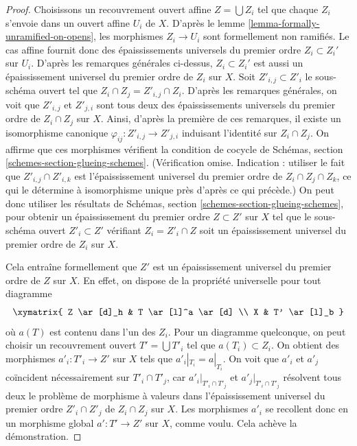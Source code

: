 \begin{proof}
\medskip\noindent
Choisissons un recouvrement ouvert affine $Z = \bigcup Z_i$ tel que chaque $Z_i$
s'envoie dans un ouvert affine $U_i$ de $X$. D'après
le lemme \ref{lemma-formally-unramified-on-opens},
les morphismes $Z_i \to U_i$ sont formellement non ramifiés.
Le cas affine fournit donc des épaississements universels du premier ordre
$Z_i \subset Z_i'$ sur $U_i$. D'après les remarques générales ci-dessus,
$Z_i \subset Z_i'$ est aussi un épaississement universel du premier ordre de
$Z_i$ sur $X$. Soit $Z'_{i, j} \subset Z'_i$ le sous-schéma ouvert
tel que $Z_i \cap Z_j = Z'_{i, j} \cap Z_i$. D'après les remarques générales,
on voit que $Z'_{i, j}$ et $Z'_{j, i}$ sont tous deux des épaississements universels du premier
ordre de $Z_i \cap Z_j$ sur $X$. Ainsi, d'après
la première de ces remarques, il existe un isomorphisme canonique
$\varphi_{ij} : Z'_{i, j} \to Z'_{j, i}$ induisant l'identité sur
$Z_i \cap Z_j$. On affirme que ces morphismes vérifient la condition de cocycle de
Schémas, section \ref{schemes-section-glueing-schemes}.
(Vérification omise. Indication : utiliser le fait que $Z'_{i, j} \cap Z'_{i, k}$ est
l'épaississement universel du premier ordre de $Z_i \cap Z_j \cap Z_k$, ce qui le détermine
à isomorphisme unique près d'après ce qui précède.)
On peut donc utiliser les résultats de
Schémas, section \ref{schemes-section-glueing-schemes},
pour obtenir un épaississement du premier ordre $Z \subset Z'$ sur $X$ tel que
le sous-schéma ouvert $Z'_i \subset Z'$ vérifiant $Z_i = Z'_i \cap Z$
soit un épaississement universel du premier ordre de $Z_i$ sur $X$.

\medskip\noindent
Cela entraîne formellement que $Z'$ est un épaississement universel du premier
ordre de $Z$ sur $X$. En effet, on dispose de la propriété universelle pour tout
diagramme
$$
\xymatrix{
Z \ar[d]_h & T \ar[l]^a \ar[d] \\
X & T' \ar[l]_b
}
$$
où $a(T)$ est contenu dans l'un des $Z_i$. Pour un diagramme quelconque, on peut
choisir un recouvrement ouvert $T' = \bigcup T'_i$ tel que $a(T_i) \subset Z_i$.
On obtient des morphismes $a'_i : T'_i \to Z'$ sur $X$ tels que
$a'_i|_{T_i} = a|_{T_i}$. On voit que $a'_i$ et $a'_j$ coïncident nécessairement
sur $T'_i \cap T'_j$, car $a'_i|_{T'_i \cap T'_j}$ et
$a'_j|_{T'_i \cap T'_j}$ résolvent tous deux le problème de morphisme à valeurs dans
l'épaississement universel du premier ordre $Z'_i \cap Z'_j$ de $Z_i \cap Z_j$ sur $X$.
Les morphismes $a'_i$ se recollent donc en un morphisme global
$a' : T' \to Z'$ sur $X$, comme voulu. Cela achève la démonstration.
\end{proof}


